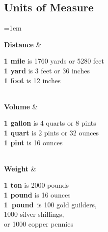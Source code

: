 \documentclass[itdr]{subfiles}
\begin{document}
\begin{dbox}
	\subsection*{Units of Measure}

\bgroup
\tabcolsep=1em

\begin{dtable}[cL]
	\textbf{Distance} & \parbox{\linewidth}{%
			\textbf{1 mile} is 1760 yards or 5280 feet\\
			\textbf{1 yard} is 3 feet or 36 inches\\
			\textbf{1 foot} is 12 inches} \\
	\midrule
	\textbf{Volume} & \parbox{\linewidth}{%
			\textbf{1 gallon} is 4 quarts or 8 pints\\
			\textbf{1 quart} is 2 pints or 32 ounces\\
			\textbf{1 pint} is 16 ounces} \\
	\midrule
	\textbf{Weight} & \parbox{\linewidth}{%
			\textbf{1 ton} is 2000 pounds\\
			\textbf{1 pound} is 16 ounces\\
			\mbox{\textbf{1 pound} is} 100 gold guilders,\\1000 silver shillings,\\or 1000 copper pennies } \\
\end{dtable}
\egroup

\begin{comment}
	\subparagraph{Distance}
	\begin{itemize}
		\item \textbf{1 mile} is 1760 yards or 5280 feet
		\item \textbf{1 yard} is 3 feet or 36 inches
		\item \textbf{1 foot} is 12 inches
	\end{itemize}

	\subparagraph{Volume}
	\begin{itemize}
		\item \textbf{1 gallon} is 4 quarts or 8 pints
		\item \textbf{1 quart} is 2 pints or 32 ounces
		\item \textbf{1 pint} is 16 ounces
	\end{itemize}
	
	\subparagraph{Weight}
	\begin{itemize}
		\item \textbf{1 ton} is 2000 pounds
		\item \textbf{1 pound} is 16 ounces
		\item \mbox{\textbf{1 pound} is} 100 gold guilders, 1000 silver shillings, or 1000 copper pennies
	\end{itemize}
\end{comment}
\end{dbox}

\break
\end{document}
